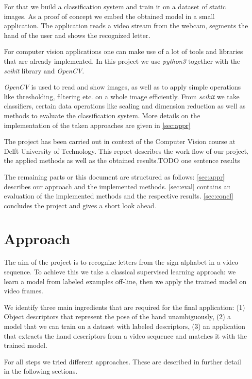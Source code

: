 \documentclass[letterpaper, 10 pt, conference]{ieeeconf}  %
\begin{document}
For that we build a classification system and train it on a dataset of static images. As a proof of concept we embed the obtained model in a small application. The application reads a video stream from the webcam, segments the hand of the user and shows the recognized letter.

For computer vision applications one can make use of a lot of tools and libraries that are already implemented. In this project we use \textit{python3} together with the \textit{scikit} library and \textit{OpenCV}. 

\textit{OpenCV} is used to read and show images, as well as to apply simple operations like thresholding, filtering etc. on a whole image efficiently. From \textit{scikit} we take classifiers, certain data operations like scaling and dimension reduction as well as methods to evaluate the classification system. More details on the implementation of the taken approaches are given in \autoref{sec:appr}

The project has been carried out in context of the Computer Vision course at Delft University of Technology. This report describes the work flow of our project, the applied methods as well as the obtained results.TODO one sentence results

The remaining parts or this document are structured as follows: \autoref{sec:appr} describes our approach and the implemented methods. \autoref{sec:eval} contains an evaluation of the implemented methods and the respective results. \autoref{sec:concl} concludes the project and gives a short look ahead.


\section{Approach}
\label{sec:appr}
The aim of the project is to recognize letters from the sign alphabet in a video sequence. To achieve this we take a classical supervised learning approach: we learn a model from labeled examples off-line, then we apply the trained model on video frames.

We identify three main ingredients that are required for the final application: (1) Object descriptors that represent the pose of the hand unambiguously, (2) a model that we can train on a dataset with labeled descriptors, (3) an application that extracts the hand descriptors from a video sequence and matches it with the trained model.

For all steps we tried different approaches. These are described in further detail in the following sections. 
\end{document}
